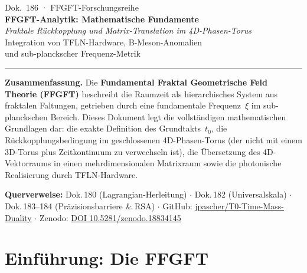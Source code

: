 
\thispagestyle{firstpage}
\begin{center}
  {\small\color{T0gray} Dok.~186 · FFGFT-Forschungsreihe}\\[6pt]
  {\LARGE\bfseries\color{T0blue}
    FFGFT-Analytik: Mathematische Fundamente}\\[6pt]
  {\large\itshape\color{T0gray}
    Fraktale Rückkopplung und Matrix-Translation im 4D-Phasen-Torus}\\[4pt]
  {\normalsize\color{T0gray}
    Integration von TFLN-Hardware, B-Meson-Anomalien\\
    und sub-planckscher Frequenz-Metrik}\\[8pt]
  {\color{T0red}\rule{0.65\linewidth}{1.5pt}}
\end{center}
\vspace{4pt}

\begin{infobox}
\textbf{Zusammenfassung.}
Die \textbf{Fundamental Fraktal Geometrische Feld Theorie (FFGFT)} beschreibt
die Raumzeit als hierarchisches System aus fraktalen Faltungen, getrieben
durch eine fundamentale Frequenz~$\xi$ im sub-planckschen Bereich.
Dieses Dokument legt die vollständigen mathematischen Grundlagen dar:
die exakte Definition des Grundtakts~$t_0$, die Rückkopplungsbedingung im
geschlossenen 4D-Phasen-Torus (der nicht mit einem 3D-Torus plus Zeitkontinuum
zu verwechseln ist), die Übersetzung des 4D-Vektorraums in einen mehrdimensionalen
Matrixraum sowie die photonische Realisierung durch TFLN-Hardware.

\smallskip\noindent\textbf{Querverweise:}
Dok.\,180 (Lagrangian-Herleitung) $\cdot$
Dok.\,182 (Universalskala) $\cdot$
Dok.\,183--184 (Präzisionsbarriere \& RSA) $\cdot$
GitHub: \href{https://github.com/jpascher/T0-Time-Mass-Duality}{jpascher/T0-Time-Mass-Duality} $\cdot$
Zenodo: \href{https://zenodo.org/records/18834145}{DOI 10.5281/zenodo.18834145}
\end{infobox}

\tableofcontents
\bigskip

\section{Einführung: Die FFGFT}

